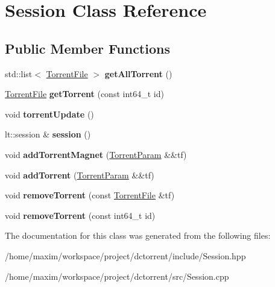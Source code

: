\hypertarget{class_session}{}\section{Session Class Reference}
\label{class_session}
\subsection*{Public Member Functions}
\begin{DoxyCompactItemize}
\item 
\mbox{\label{class_session_a6737074b34547727cd703250d8374d06}} 
std\+::list$<$ \hyperlink{class_torrent_file}{Torrent\+File} $>$ {\bfseries get\+All\+Torrent} ()
\item 
\mbox{\label{class_session_a79df8817751b97160c096e3cf149d845}} 
\hyperlink{class_torrent_file}{Torrent\+File} {\bfseries get\+Torrent} (const int64\+\_\+t id)
\item 
\mbox{\label{class_session_a30028efacc66ba9a49455c4cff0b325a}} 
void {\bfseries torrent\+Update} ()
\item 
\mbox{\label{class_session_ae651253171e918d5d6b1a1081ebe8f32}} 
lt\+::session \& {\bfseries session} ()
\item 
\mbox{\label{class_session_aa160f757e11e9e68075d28ae1309ae85}} 
void {\bfseries add\+Torrent\+Magnet} (\hyperlink{class_torrent_param}{Torrent\+Param} \&\&tf)
\item 
\mbox{\label{class_session_ac6bbf71f6931ee121fb169fb134d9395}} 
void {\bfseries add\+Torrent} (\hyperlink{class_torrent_param}{Torrent\+Param} \&\&tf)
\item 
\mbox{\label{class_session_adc5d2ea634964b3898fdb7b600e1ea87}} 
void {\bfseries remove\+Torrent} (const \hyperlink{class_torrent_file}{Torrent\+File} \&tf)
\item 
\mbox{\label{class_session_a372beddfe745b1b3620960ee8698738a}} 
void {\bfseries remove\+Torrent} (const int64\+\_\+t id)
\end{DoxyCompactItemize}


The documentation for this class was generated from the following files\+:\begin{DoxyCompactItemize}
\item 
/home/maxim/workspace/project/dctorrent/include/Session.\+hpp\item 
/home/maxim/workspace/project/dctorrent/src/Session.\+cpp\end{DoxyCompactItemize}
